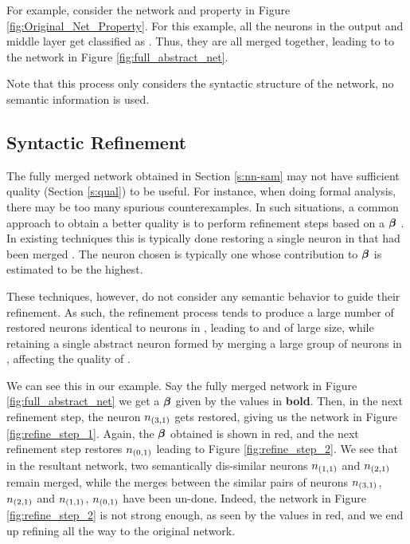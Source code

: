 


For example, consider the network and property in Figure
\ref{fig:Original_Net_Property}. For this example, all the neurons in the output
and middle layer get classified as \inc. Thus, they are all merged together,
leading to to the network in Figure \ref{fig:full_abstract_net}.

Note that this process only considers the syntactic structure of the network, no
semantic information is used.

\subsection{ Syntactic Refinement }

The fully merged network obtained in Section \ref{s:nn-sam} may not have
sufficient quality (Section \ref{s:qual}) to be useful. For instance, when doing
formal analysis, there may be too many spurious counterexamples. In such
situations, a common approach to obtain a better quality \abs is to perform
refinement steps based on a \gencex $\boldsymbol{\beta}$ \cite{cegar-nn,
cegarette, cleverest-nn}. In
existing techniques this is typically done restoring a single neuron in \cnc
that had been merged \abs. The neuron chosen is typically one whose contribution
to $\boldsymbol{\beta}$ is estimated to be the highest.

These techniques, however, do not consider any semantic behavior to guide their
refinement. As such, the refinement process tends to produce a large number of
restored neurons identical to neurons in \cnc, leading to and \abs of large
size, while retaining a single abstract neuron formed by merging a large group
of neurons in \cnc, affecting the quality of \abs. 

We can see this in our example. Say the fully merged network in Figure
\ref{fig:full_abstract_net} we get a $\boldsymbol{\beta}$ given by the values in \textbf{bold}.
Then, in the next refinement step, the neuron $n_{(3,1)}$ gets restored, giving
us the network in Figure \ref{fig:refine_step_1}. Again, the $\boldsymbol{\beta}$
obtained is shown in red, and the next refinement step restores $n_{(0,1)}$
leading to Figure \ref{fig:refine_step_2}. We see that in the resultant network,
two semantically dis-similar neurons $n_{(1,1)}$ and $n_{(2,1)}$ remain merged,
while the merges between the similar pairs of neurons $n_{(3,1)}$, $n_{(2,1)}$
and $n_{(1,1)}$, $n_{(0,1)}$ have been un-done. Indeed, the network in Figure
\ref{fig:refine_step_2} is not strong enough, as seen by the values in red, and
we end up refining all the way to the original network.



